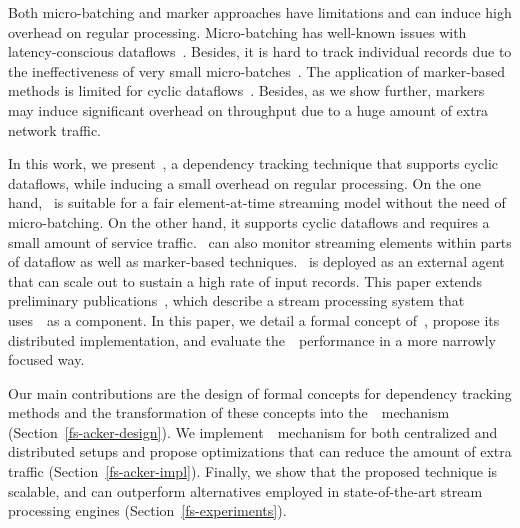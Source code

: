 Both micro-batching and marker approaches have limitations and can induce high overhead on regular processing. Micro-batching has well-known issues with latency-conscious dataflows~\cite{S7530084}. Besides, it is hard to track individual records due to the ineffectiveness of very small micro-batches~\cite{Zaharia:2012:DSE:2342763.2342773}. The application of marker-based methods is limited for cyclic dataflows~\cite{Carbone:2017:SMA:3137765.3137777}. Besides, as we show further, markers may induce significant overhead on throughput due to a huge amount of extra network traffic.

In this work, we present~\tracker , a dependency tracking technique that supports cyclic dataflows, while inducing a small overhead on regular processing. On the one hand, \tracker\ is suitable for a fair element-at-time streaming model without the need of micro-batching. On the other hand, it supports cyclic dataflows and requires a small amount of service traffic. \tracker\ can also monitor streaming elements within parts of dataflow as well as marker-based techniques. \tracker\ is deployed as an external agent that can scale out to sustain a high rate of input records. This paper extends preliminary publications~\cite{we2018beyondmr, we2018adbis, thepaper}, which describe a stream processing system that uses~\tracker\ as a component. In this paper, we detail a formal concept of~\tracker , propose its distributed implementation, and evaluate the~\tracker\ performance in a more narrowly focused way.

Our main contributions are the design of formal concepts for dependency tracking methods and the transformation of these concepts into the~\tracker\ mechanism (Section~\ref{fs-acker-design}). We implement~\tracker\ mechanism for both centralized and distributed setups and propose optimizations that can reduce the amount of extra traffic (Section~\ref{fs-acker-impl}). Finally, we show that the proposed technique is scalable, and can outperform alternatives employed in state-of-the-art stream processing engines (Section~\ref{fs-experiments}).